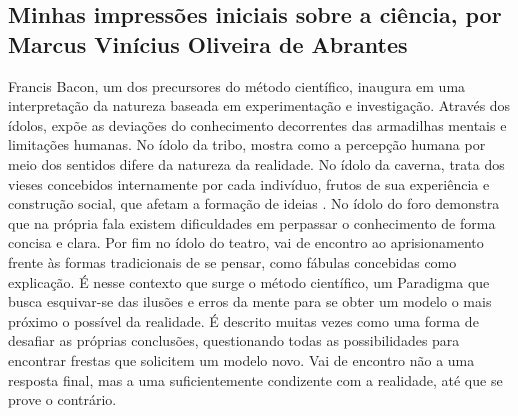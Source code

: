 \subsection{Minhas impressões iniciais sobre a ciência, por Marcus Vinícius Oliveira de Abrantes}
Francis Bacon, um dos precursores do método científico, inaugura em \citep{bacon_novrum_1620} uma interpretação da natureza baseada em experimentação e investigação. Através dos ídolos, expõe as deviações do conhecimento decorrentes das armadilhas mentais e limitações humanas. No ídolo da tribo, mostra como a percepção humana por meio dos sentidos difere da natureza da realidade. No ídolo da caverna, trata dos vieses concebidos internamente por cada indivíduo, frutos de sua experiência e construção social, que afetam a formação de ideias . No ídolo do foro demonstra que na própria fala existem dificuldades  em perpassar o conhecimento de forma concisa e clara. Por fim no ídolo do teatro, vai de encontro ao aprisionamento frente às formas tradicionais de se pensar, como fábulas concebidas como explicação.
É nesse contexto que surge o método científico, um \gls{Paradigma}  que busca esquivar-se das ilusões e erros da mente para se obter um modelo o mais próximo o possível da realidade. É descrito muitas vezes como uma forma de desafiar as próprias conclusões, questionando todas as possibilidades para encontrar frestas que solicitem um modelo novo. Vai de encontro não a uma resposta final, mas a uma suficientemente condizente com a realidade, até que se prove o contrário.